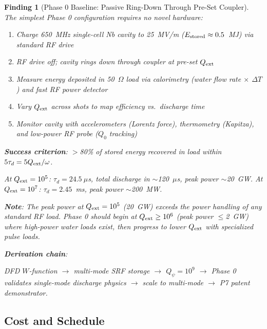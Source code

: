 \documentclass[11pt]{article}
\newtheorem{finding}{Finding}
\begin{document}
\begin{finding}[Phase 0 Baseline: Passive Ring-Down Through Pre-Set Coupler]
\label{find:phase0-baseline}
The simplest Phase 0 configuration requires no novel hardware:
\begin{enumerate}[nosep]
  \item Charge 650~MHz single-cell Nb cavity to 25~MV/m ($E_{\rm stored}
    \approx 0.5$~MJ) via standard RF drive
  \item RF drive off; cavity rings down through coupler at pre-set
    $Q_{\rm ext}$
  \item Measure energy deposited in 50~$\Omega$ load via calorimetry
    (water flow rate $\times$ $\Delta T$) and fast RF power detector
  \item Vary $Q_{\rm ext}$ across shots to map efficiency vs.\
    discharge time
  \item Monitor cavity with accelerometers (Lorentz force),
    thermometry (Kapitza), and low-power RF probe ($Q_0$ tracking)
\end{enumerate}

\textbf{Success criterion}: $>$80\% of stored energy recovered
in load within $5\tau_d = 5Q_{\rm ext}/\omega$.

At $Q_{\rm ext} = 10^5$: $\tau_d = 24.5~\mu$s, total discharge
in $\sim$120~$\mu$s, peak power $\sim$20~GW.
At $Q_{\rm ext} = 10^7$: $\tau_d = 2.45$~ms, peak power $\sim$200~MW.

\textbf{Note}: The peak power at $Q_{\rm ext} = 10^5$ (20~GW)
exceeds the power handling of any standard RF load. Phase 0
should begin at $Q_{\rm ext} \geq 10^6$ (peak power $\leq$2~GW)
where high-power water loads exist, then progress to lower
$Q_{\rm ext}$ with specialized pulse loads.

\textbf{Derivation chain}:
\begin{center}
DFD $W$-function $\to$ multi-mode SRF storage $\to$ $Q_\psi = 10^9$
$\to$ Phase 0 validates single-mode discharge physics $\to$
scale to multi-mode $\to$ P7 patent demonstrator.
\end{center}
\end{finding}

\subsection{Cost and Schedule}
\end{document}
